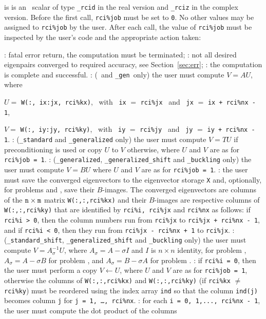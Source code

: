 \begin{description}
%
 is is an \intentinout\ scalar  of type
{\tt \solver\_rcid} in the real version and
{\tt \solver\_rciz} in the complex version.
Before the first call, {\tt rci\%job} must be set to {\tt 0}.
No other values may be assigned to {\tt rci\%job} by the user.
After each call,
the value of {\tt rci\%job} must be inspected by the user's code
and the appropriate action taken: 
%
\begin{description}
%
: fatal error return, the computation must be terminated;
%
: 
not all desired eigenpairs converged to required accuracy,
see Section~\ref{sec:err}; 
%
: the computation is complete and successful.
%
:
({\tt \solver}\ and {\tt \solver\_gen}\ only)
the user must compute $V = A U$, where

\hspace{8mm}
$U=$ {\tt W(:, ix:jx, rci\%kx)}, 
~with~ {\tt ix} $=$ {\tt rci\%jx} 
~and~
{\tt jx} $=$ {\tt ix + rci\%nx - 1},

\hspace{8mm}
$V=$ {\tt W(:, iy:jy, rci\%ky)},
~with~ {\tt iy} $=$ {\tt rci\%jy} 
~and~
{\tt jy} $=$ {\tt iy + rci\%nx - 1}.
%
:
({\tt \solver\_standard} and {\tt \solver\_generalized} only)
the user must
compute $V = T U$ if preconditioning is used
or copy $U$ to $V$ otherwise,
where $U$ and $V$ are as for {\tt rci\%job = 1}.
%
:
({\tt \solver\_generalized}, {\tt \solver\_generalized\_shift} 
and {\tt \solver\_buckling} only)
the user must compute $V = B U$ 
where $U$ and $V$ are as for {\tt rci\%job = 1}.
%
: the user must save the converged eigenvectors
to the eigenvector storage {\tt X}
and, optionally, 
for problems  and ,
save their $B$-images.
The converged eigenvectors are columns of the ${\tt n}\times {\tt m}$ matrix
{\tt W(:,:,rci\%kx)} and their $B$-images are respective columns of
{\tt W(:,:,rci\%ky)}
that are identified by
{\tt rci\%i, rci\%jx} and {\tt rci\%nx}
as follows:
if {\tt rci\%i > 0}, then the column numbers
run from {\tt rci\%jx} to {\tt rci\%jx + rci\%nx - 1},
and if {\tt rci\%i < 0}, then they run
from {\tt rci\%jx - rci\%nx + 1} to {\tt rci\%jx}.
%
:
({\tt \solver\_standard\_shift}, {\tt \solver\_generalized\_shift}
and {\tt \solver\_buckling} only)
the user must compute $V = A_\sigma^{-1} U$, where
$A_\sigma = A - \sigma I$
and $I$ is $n\times n$ identity,
for problem , 
$A_\sigma = A - \sigma B$ for problem ,
and 
$A_\sigma = B - \sigma A$ for problem .
%
:
if {\tt rci\%i = 0}, then
the user  must perform a copy $V \leftarrow U$, 
where $U$ and $V$ are as for {\tt rci\%job = 1},
otherwise the columns of {\tt W(:,:,rci\%kx)}
and {\tt W(:,:,rci\%ky)}
(if {\tt rci\%kx} $\not=$ {\tt rci\%ky}) 
must be reordered using
the index array {\tt ind} so that %
the column {\tt ind(j)} becomes column {\tt j}
for {\tt j = 1, \ldots, rci\%nx}.
%
:
for each
{\tt i = 0, 1,..., rci\%nx - 1}, 
the user must compute the dot product of
the columns 


\end{description}
\end{description}
